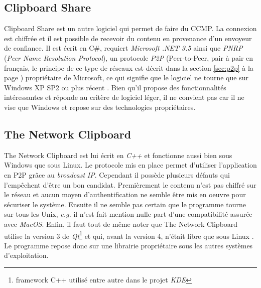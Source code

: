 \subsection{Clipboard Share}
Clipboard Share \cite{clipshare} est un autre logiciel qui permet de faire
du CCMP. La connexion est chiffrée et il est possible de recevoir
du contenu en provenance d'un envoyeur de confiance. Il est écrit en C\#,
requiert \emph{Microsoft .NET 3.5} ainsi que \emph{PNRP} (\emph{Peer Name
Resolution Protocol}), un protocole \emph{P2P} (Peer-to-Peer, pair à pair en
français, le principe de ce type de réseaux est décrit dans la section
\ref{sec:p2p} à la page \pageref{sec:p2p}) propriétaire de Microsoft,
ce qui signifie que le logiciel ne tourne que sur Windows XP SP2 ou plus
récent \cite{wiki:pnrp}. Bien qu'il propose des fonctionnalités intéressantes
et réponde au critère de logiciel léger, il ne convient pas car il ne vise
que Windows et repose sur des technologies propriétaires.

\subsection{The Network Clipboard}
The Network Clipboard \cite{netclip} est lui écrit en \emph{C++} et fonctionne
aussi bien sous Windows que sous Linux. Le protocole mis en place permet
d'utiliser l'application en P2P grâce au \emph{broadcast} \emph{IP}.
Cependant il possède plusieurs défauts qui l'empêchent d'être un bon candidat.
Premièrement le contenu n'est pas chiffré sur le réseau et aucun moyen
d'authentification ne semble être mis en oeuvre pour sécuriser le système.
Ensuite il ne semble pas certain que le programme tourne sur tous les Unix,
\emph{e.g.} il n'est fait mention nulle part d'une compatibilité assurée
avec \emph{MacOS}. Enfin, il faut tout de même noter que The Network
Clipboard utilise la version 3 de \emph{Qt}\footnote{framework C++ utilisé
entre autre dans le projet \emph{KDE}} et qui, avant la version 4, n'était
libre que sous Linux \cite{wiki:qt}.
Le programme repose donc sur une librairie propriétaire sous les autres
systèmes d'exploitation.


